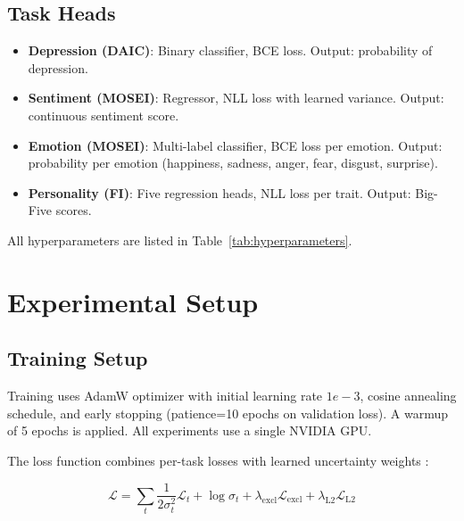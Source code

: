 \documentclass[12pt,oneside]{book}
\begin{document}
\subsection{Task Heads}

\begin{itemize}
    \item \textbf{Depression (DAIC)}: Binary classifier, BCE loss. Output: probability of depression.
    \item \textbf{Sentiment (MOSEI)}: Regressor, NLL loss with learned variance. Output: continuous sentiment score.
    \item \textbf{Emotion (MOSEI)}: Multi-label classifier, BCE loss per emotion. Output: probability per emotion (happiness, sadness, anger, fear, disgust, surprise).
    \item \textbf{Personality (FI)}: Five regression heads, NLL loss per trait. Output: Big-Five scores.
\end{itemize}

All hyperparameters are listed in Table~\ref{tab:hyperparameters}.



\section{Experimental Setup}
\label{sec:setup}

\subsection{Training Setup}
\label{sec:training_setup}

Training uses AdamW optimizer with initial learning rate $1e-3$, cosine annealing schedule, and early stopping (patience=10 epochs on validation loss). A warmup of 5 epochs is applied. All experiments use a single NVIDIA GPU.

The loss function combines per-task losses with learned uncertainty weights \citep{kendall2017uncertainties}:

\begin{equation}
    \mathcal{L} = \sum_t \frac{1}{2\sigma_t^2} \mathcal{L}_t + \log \sigma_t + \lambda_{\text{excl}} \mathcal{L}_{\text{excl}} + \lambda_{\text{L2}} \mathcal{L}_{\text{L2}}
\end{equation}
\end{document}
